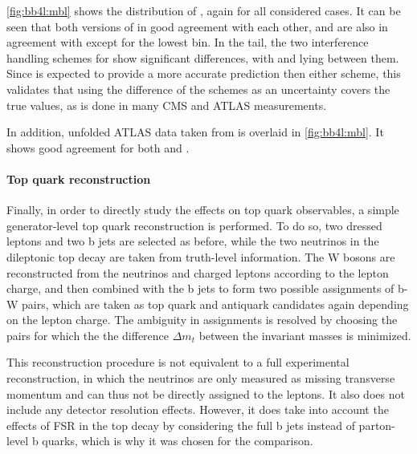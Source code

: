 \cref{fig:bb4l:mbl} shows the distribution of \mblminimax, again for all considered cases. It can be seen that both versions of \bbfourl in good agreement with each other, and are also in agreement with \ttb except for the lowest bin. In the tail, the two interference handling schemes for \tttWsum show significant differences, with \bbfourl and \ttb lying between them. Since \bbfourl is expected to provide a more accurate prediction then either scheme, this validates that using the difference of the schemes as an uncertainty covers the true values, as is done in many CMS and ATLAS measurements.

In addition, unfolded ATLAS data taken from  is overlaid in \cref{fig:bb4l:mbl}. It shows good agreement for both \bbfourl and \ttb.

\paragraph{Top quark reconstruction} Finally, in order to directly study the effects on top quark observables, a simple generator-level top quark reconstruction is performed. To do so, two dressed leptons and two b jets are selected as before, while the two neutrinos in the dileptonic top decay are taken from truth-level information. The W bosons are reconstructed from the neutrinos and charged leptons according to the lepton charge, and then combined with the b jets to form two possible assignments of b-W pairs, which are taken as top quark and antiquark candidates again depending on the lepton charge. The ambiguity in assignments is resolved by choosing the pairs for which the the difference $\Delta m_t$ between the invariant masses is minimized. 

This reconstruction procedure is not equivalent to a full experimental reconstruction, in which the neutrinos are only measured as missing transverse momentum and can thus not be directly assigned to the leptons. It also does not include any detector resolution effects. However, it does take into account the effects of FSR in the top decay by considering the full b jets instead of parton-level b quarks, which is why it was chosen for the comparison.

